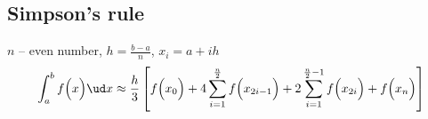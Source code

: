 \subsection{Simpson's rule}
$n$ -- even number, $h = \frac{b - a}{n}$, $x_i = a + i h$
\[\int_a^b f\Big(x\Big) \ud x \approx \frac{h}{3} \left[f\Big(x_0\Big) + 4 \sum_{i = 1}^{\frac{n}{2}} f\Big(x_{2 i - 1}\Big) + 
2 \sum_{i = 1}^{\frac{n}{2} - 1} f\Big(x_{2 i}\Big) + f\Big(x_n\Big) \right] \]
